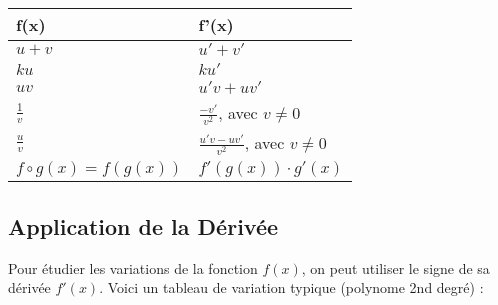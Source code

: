 \documentclass{report}
\begin{document}
    \begin{table}[h]
      \centering
      \renewcommand{\arraystretch}{1.7}
      \begin{tabular}{|>{\centering\arraybackslash}p{6cm}|>{\centering\arraybackslash}p{6cm}|}
        \hline
        \textbf{f(x)} & \textbf{f'(x)} \\
        \hline
        \( \displaystyle u + v \) & \( \displaystyle u' + v' \) \\
        \hline
        \( \displaystyle ku \) & \( \displaystyle ku' \) \\
        \hline
        \( \displaystyle uv \) & \( \displaystyle u'v + uv' \) \\
        \hline
        \( \displaystyle \frac{1}{v} \) & \( \displaystyle \frac{-v'}{v^2} \), avec \( v \neq 0 \) \\
        \hline
        \( \displaystyle \frac{u}{v} \) & \( \displaystyle \frac{u'v - uv'}{v^2} \), avec \( v \neq 0 \) \\
        \hline
        \( \displaystyle f \circ g(x) = f(g(x))\) & \( \displaystyle f'(g(x)) \cdot g'(x) \) \\
        \hline
      \end{tabular}
    \end{table}


    \subsection{Application de la Dérivée}

    Pour étudier les variations de la fonction \( f(x) \), on peut utiliser le signe de sa dérivée \( f'(x) \). Voici un tableau de variation typique (polynome 2nd degré) :

    \begin{center}
    \end{center}
\end{document}
